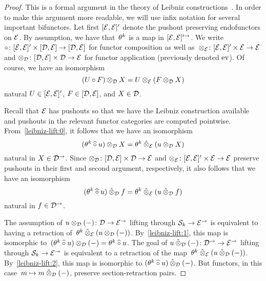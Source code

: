 \documentclass[reqno,10pt,a4paper,oneside,draft]{amsart}
\begin{document}
\begin{proof}
This is a formal argument in the theory of Leibniz constructions~\cite{riehl-verity:reedy}.
In order to make this argument more readable, we will use infix notation for several important bifunctors.
Let first $[\catE, \catE]'$ denote the pushout preserving endofunctors on $\catE$.
By assumption, we have that~$\thetak$ is a map in $[\catE, \catE]'^{\to}$.
We write $ {\cc}  \co [\catE, \catE]' \times [\cal{D}, \catE] \to [\cal{D}, \catE]$ for functor composition as well as~$\otimes_\catE \co [\catE, \catE]' \times \catE \to \catE$ and $\otimes_{\cal{D}} \co [\cal{D}, \catE] \times \cal{D} \to \catE$ for functor application (previously denoted $\eval$).
Of course, we have an isomorphism
\begin{equation} \label{leibniz-lift:0}
  (U \cc F) \otimes_{\cal{D}} X = U \otimes_\catE (F \otimes_{\cal{D}} X)
\end{equation}
natural $U \in [\catE, \catE]'$, $F \in [\cal{D}, \catE]$, and $X \in \cal{D}$.

Recall that $\catE$ has pushouts so that we have the Leibniz construction available and pushouts in the relevant functor categories are computed pointwise.
From~\eqref{leibniz-lift:0}, it follows that we have an isomorphism
\begin{equation} \label{leibniz-lift:1}
  (\thetak \cchat u) \otimes_{\cal{D}} X = \thetak \hatotimes_\catE (u \otimes_{\cal{D}} X)
\end{equation}
natural in $X \in \cal{D}^\to$.
Since $\otimes_{\cal{D}} \co [\cal{D}, \catE] \times \cal{D} \to \catE$ and $\otimes_\catE \co [\catE, \catE]' \times \catE \to \catE$ preserve pushouts in their first and second argument, respectively, it also follows that we have an isomorphism
\begin{equation} \label{leibniz-lift:2}
  (\thetak \cchat u) \hatotimes_{\cal{D}} f = \thetak \hatotimes_\catE (u \hatotimes_{\cal{D}} f)
\end{equation}
natural in $f \in \cal{D}^\to$.

The assumption of $u \otimes_{\cal{D}} (-) \co \cal{D} \to \catE^\to$ lifting through $\cal{S}_k \to \catE^\to$ is equivalent to having a retraction of~$\thetak \hatotimes_\catE (u \otimes_{\cal{D}} (-))$.
By~\eqref{leibniz-lift:1}, this map is isomorphic to~$(\thetak \cchat u) \otimes_{\cal{D}} (-) = \thetak \cchat u$.
The goal of $u \hatotimes_{\cal{D}} (-) \co \cal{D}^\to \to \catE^\to$ lifting through $\cal{S}_k \to \catE^\to$ is equivalent to a retraction of the map~$\thetak \hatotimes_\catE (u \hatotimes_{\cal{D}} (-))$.
By~\eqref{leibniz-lift:2}, this map is isomorphic to $(\thetak \cchat u) \hatotimes_{\cal{D}} (-)$.
But functors, in this case~$m \mapsto m \hatotimes_{\cal{D}} (-)$, preserve section-retraction pairs.
\end{proof}
\end{document}

